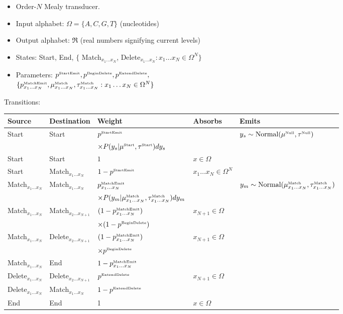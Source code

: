 \documentclass[10pt]{article}
\begin{document}
\begin{itemize}
\item Order-$N$ Mealy transducer.
\item Input alphabet: $\Omega = \{ A, C, G, T \}$ (nucleotides)
\item Output alphabet: $\Re$ (real numbers signifying current levels)
\item States: Start, End, $\{$ Match${}_{x_1 \ldots x_N}$, Delete${}_{x_1 \ldots x_N}: x_1 \ldots x_N \in \Omega^N \}$
\item Parameters:
$p^{\mbox{\tiny StartEmit}}, p^{\mbox{\tiny BeginDelete}}, p^{\mbox{\tiny ExtendDelete}},$ \\
$\{ p^{\mbox{\tiny MatchEmit}}_{x_1\ldots x_N}, \mu^{\mbox{\tiny Match}}_{x_1\ldots x_N},\tau^{\mbox{\tiny Match}}_{x_1\ldots x_N} : x_1 \ldots x_N \in \Omega^N \}$
\end{itemize}

\noindent Transitions:
\\
\noindent
\begin{tabular}{lllll}
\hline
Source & Destination & Weight & Absorbs & Emits \\
\hline
Start & Start & $p^{\mbox{\tiny StartEmit}}$ & & $y_s \sim \mbox{Normal}(\mu^{\mbox{\tiny Null}},\tau^{\mbox{\tiny Null}})$ \\
& & $\times P(y_s|\mu^{\mbox{\tiny Start}},\tau^{\mbox{\tiny Start}}) dy_s$ & & \\
Start & Start & $1$ & $x \in \Omega$ & \\
Start & Match${}_{x_1 \ldots x_N}$ & $1 - p^{\mbox{\tiny StartEmit}}$ & $x_1 \ldots x_N \in \Omega^N$ & \\
Match${}_{x_1 \ldots x_N}$ & Match${}_{x_1 \ldots x_N}$ & ${p^{\mbox{\tiny MatchEmit}}_{x_1\ldots x_N}}$ & & $y_m \sim \mbox{Normal}(\mu^{\mbox{\tiny Match}}_{x_1\ldots x_N},\tau^{\mbox{\tiny Match}}_{x_1\ldots x_N})$ \\
& & $\times P(y_m|\mu^{\mbox{\tiny Match}}_{x_1\ldots x_N},\tau^{\mbox{\tiny Match}}_{x_1\ldots x_N}) dy_m$ & & \\
Match${}_{x_1 \ldots x_N}$ & Match${}_{x_2 \ldots x_{N+1}}$ & $(1 - {p^{\mbox{\tiny MatchEmit}}_{x_1\ldots x_N}})$ & $x_{N+1} \in \Omega$ & \\
& & $\times (1 - p^{\mbox{\tiny BeginDelete}})$ & & \\
Match${}_{x_1 \ldots x_N}$ & Delete${}_{x_2 \ldots x_{N+1}}$ & $(1 - {p^{\mbox{\tiny MatchEmit}}_{x_1\ldots x_N}})$ & $x_{N+1} \in \Omega$ & \\
& & $\times p^{\mbox{\tiny BeginDelete}}$ & & \\
Match${}_{x_1 \ldots x_N}$ & End & $1 - {p^{\mbox{\tiny MatchEmit}}_{x_1\ldots x_N}}$ & & \\
Delete${}_{x_1 \ldots x_N}$ & Delete${}_{x_2 \ldots x_{N+1}}$ & $p^{\mbox{\tiny ExtendDelete}}$ & $x_{N+1} \in \Omega$ & \\
Delete${}_{x_1 \ldots x_N}$ & Match${}_{x_1 \ldots x_N}$ & $1 - p^{\mbox{\tiny ExtendDelete}}$ & & \\
End & End & 1 & $x \in \Omega$ & \\
\hline
\end{tabular}
\end{document}
